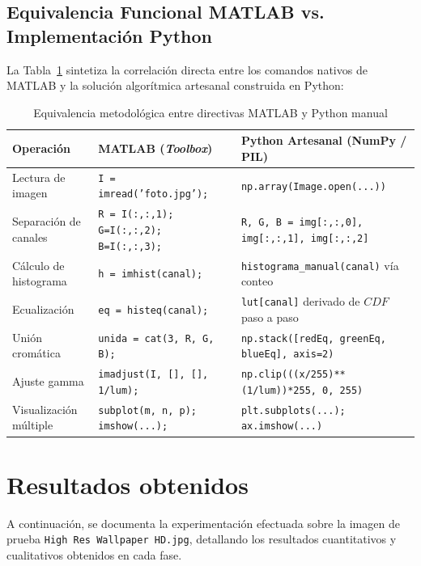 \documentclass[12pt,a4paper]{article}
\begin{document}
\subsection{Equivalencia Funcional MATLAB vs. Implementación Python}

La Tabla~\ref{tab:equivalencia_matlab} sintetiza la correlación directa entre los comandos nativos de MATLAB y la solución algorítmica artesanal construida en Python:

\begin{table}[H]
\centering
\caption{Equivalencia metodológica entre directivas MATLAB y Python manual}
\label{tab:equivalencia_matlab}
\renewcommand{\arraystretch}{1.25}
\footnotesize
\begin{tabularx}{\textwidth}{p{3.2cm}p{5.5cm}X}
\toprule
\textbf{Operación} & \textbf{MATLAB (\textit{Toolbox})} & \textbf{Python Artesanal (NumPy / PIL)} \\
\midrule
Lectura de imagen & \texttt{I = imread('foto.jpg');} & \texttt{np.array(Image.open(...))} \\
Separación de canales & \texttt{R = I(:,:,1); G=I(:,:,2); B=I(:,:,3);} & \texttt{R, G, B = img[:,:,0], img[:,:,1], img[:,:,2]} \\
Cálculo de histograma & \texttt{h = imhist(canal);} & \texttt{histograma\_manual(canal)} vía conteo \\
Ecualización & \texttt{eq = histeq(canal);} & \texttt{lut[canal]} derivado de $CDF$ paso a paso \\
Unión cromática & \texttt{unida = cat(3, R, G, B);} & \texttt{np.stack([redEq, greenEq, blueEq], axis=2)} \\
Ajuste gamma & \texttt{imadjust(I, [], [], 1/lum);} & \texttt{np.clip(((x/255)**(1/lum))*255, 0, 255)} \\
Visualización múltiple & \texttt{subplot(m, n, p); imshow(...);} & \texttt{plt.subplots(...); ax.imshow(...)} \\
\bottomrule
\end{tabularx}
\end{table}

\section{Resultados obtenidos}

A continuación, se documenta la experimentación efectuada sobre la imagen de prueba \texttt{High Res Wallpaper HD.jpg}, detallando los resultados cuantitativos y cualitativos obtenidos en cada fase.
\end{document}
